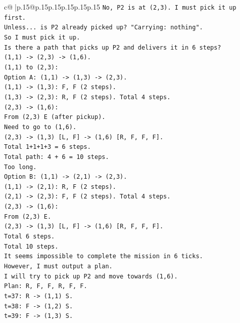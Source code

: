 \documentclass{article}
\begin{document}
{\begin{supertabular}{c@{$\;$}|p{.15\linewidth}@{}p{.15\linewidth}p{.15\linewidth}p{.15\linewidth}p{.15\linewidth}p{.15\linewidth}}
{{{\texttt{No, P2 is at (2,3). I must pick it up first.} \\
\texttt{Unless... is P2 already picked up? "Carrying: nothing".} \\
\texttt{So I must pick it up.} \\
\texttt{Is there a path that picks up P2 and delivers it in 6 steps?} \\
\texttt{(1,1) {-}> (2,3) {-}> (1,6).} \\
\texttt{(1,1) to (2,3):} \\
\texttt{Option A: (1,1) {-}> (1,3) {-}> (2,3).} \\
\texttt{(1,1) {-}> (1,3): F, F (2 steps).} \\
\texttt{(1,3) {-}> (2,3): R, F (2 steps). Total 4 steps.} \\
\texttt{(2,3) {-}> (1,6):} \\
\texttt{From (2,3) E (after pickup).} \\
\texttt{Need to go to (1,6).} \\
\texttt{(2,3) {-}> (1,3) {[}L, F{]} {-}> (1,6) {[}R, F, F, F{]}.} \\
\texttt{Total 1+1+1+3 = 6 steps.} \\
\texttt{Total path: 4 + 6 = 10 steps.} \\
\texttt{Too long.} \\
\texttt{Option B: (1,1) {-}> (2,1) {-}> (2,3).} \\
\texttt{(1,1) {-}> (2,1): R, F (2 steps).} \\
\texttt{(2,1) {-}> (2,3): F, F (2 steps). Total 4 steps.} \\
\texttt{(2,3) {-}> (1,6):} \\
\texttt{From (2,3) E.} \\
\texttt{(2,3) {-}> (1,3) {[}L, F{]} {-}> (1,6) {[}R, F, F, F{]}.} \\
\texttt{Total 6 steps.} \\
\texttt{Total 10 steps.} \\
\texttt{It seems impossible to complete the mission in 6 ticks.} \\
\texttt{However, I must output a plan.} \\
\texttt{I will try to pick up P2 and move towards (1,6).} \\
\texttt{Plan: R, F, F, R, F, F.} \\
\texttt{t=37: R {-}> (1,1) S.} \\
\texttt{t=38: F {-}> (1,2) S.} \\
\texttt{t=39: F {-}> (1,3) S.} \\
}}}
\end{supertabular}}
\end{document}
